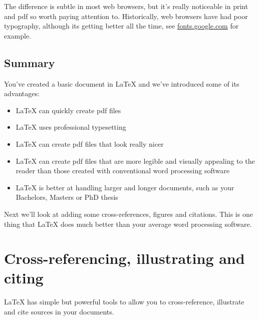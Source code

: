 \documentclass[
]{book}
\providecommand{\tightlist}{%
  \setlength{\itemsep}{0pt}\setlength{\parskip}{0pt}}
\begin{document}
The difference is subtle in most web browsers, but it's really noticeable in print and pdf so worth paying attention to. Historically, web browsers have had poor typography, although its getting better all the time, see \href{https://fonts.google.com/}{fonts.google.com} for example.

\hypertarget{concsimple}{%
\section{Summary}\label{concsimple}}

You've created a basic document in LaTeX and we've introduced some of its advantages:

\begin{itemize}
\tightlist
\item
  LaTeX can quickly create pdf files
\item
  LaTeX uses professional typesetting
\item
  LaTeX can create pdf files that look really nicer
\item
  LaTeX can create pdf files that are more legible and visually appealing to the reader than those created with conventional word processing software
\item
  LaTeX is better at handling larger and longer documents, such as your Bachelors, Masters or PhD thesis
\end{itemize}

Next we'll look at adding some cross-references, figures and citations. This is one thing that LaTeX does much better than your average word processing software.

\hypertarget{figref}{%
\chapter{Cross-referencing, illustrating and citing}\label{figref}}

LaTeX has simple but powerful tools to allow you to cross-reference, illustrate and cite sources in your documents.
\end{document}
